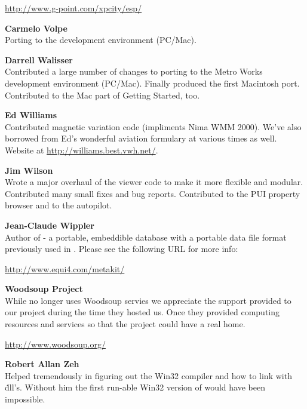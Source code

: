   \href{http://www.g-point.com/xpcity/esp/}{http://www.g-point.com/xpcity/esp/}
\medskip


\noindent \textbf{Carmelo Volpe}\\
  Porting \FlightGear{} to the  development environment
  (PC/Mac).
 \medskip

\noindent \textbf{Darrell Walisser}\\
 Contributed a large number of changes to porting \FlightGear{} to the Metro Works development environment (PC/Mac). Finally produced the first Macintosh port. Contributed to the Mac part of Getting Started, too.
\medskip

\noindent \textbf{Ed Williams}\\
  Contributed magnetic variation code (impliments Nima WMM 2000).
  We've also borrowed from Ed's wonderful aviation formulary at various
  times as well. Website at
  \medskip
  \href{http://williams.best.vwh.net/}{http://williams.best.vwh.net/}.
 \medskip


\noindent \textbf{Jim Wilson}\\
 Wrote a major overhaul of the viewer code to make it more flexible and modular. Contributed many small fixes and bug reports. Contributed to the PUI property browser and to the autopilot.
 \medskip

 \noindent \textbf{Jean-Claude Wippler}\\
  Author of  - a portable, embeddible database with a
  portable data file format previously used in \FlightGear{}. Please
  see the following URL for more info:
 \medskip

  \href{http://www.equi4.com/metakit/}{http://www.equi4.com/metakit/}
  \medskip

\noindent \textbf{Woodsoup Project}\\

  While \FlightGear{} no longer uses Woodsoup servies we appreciate the
  support provided to our project during the time they hosted us. Once they
  provided computing resources and services so that the \FlightGear{} project
  could have a real home.

\href{http://www.woodsoup.org/}{http://www.woodsoup.org/}
  \medskip

\noindent \textbf{Robert Allan Zeh}\\
  Helped tremendously in figuring out the  Win32 compiler and
  how to link with \.dll's.  Without him the first run-able Win32
  version of \FlightGear{} would have been impossible.
  \medskip

